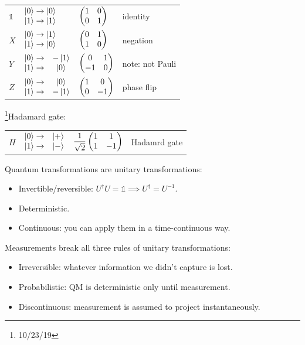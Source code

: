 \documentclass[12pt]{article}
\newcommand*\id{\mathds{1}}
\begin{document}
\begin{center}
\begin{tabular}{llll}
    $\id$
    & $\mqty{\ket{0}\rightarrow\ket{0} \\ \ket{1}\rightarrow\ket{1}}$
    & $\pmqty{\imat{2}}$
    & identity
    \\[5ex] $X$
    & $\mqty{\ket{0}\rightarrow\ket{1} \\ \ket{1}\rightarrow\ket{0}}$
    & $\pmqty{\pmat{1}}$
    & negation
    \\[5ex] $Y$
    & $\mqty{\ket{0}\rightarrow&-\ket{1} \\ \ket{1}\rightarrow&\ket{0}}$
    & $\pmqty{0&1\\-1&0}$
    & note: not Pauli
    \\[5ex] $Z$
    & $\mqty{\ket{0}\rightarrow&\ket{0} \\ \ket{1}\rightarrow&-\ket{1}}$
    & $\pmqty{\pmat{3}}$
    & phase flip
\end{tabular}
\end{center}

\footnote{10/23/19}Hadamard gate:
\begin{center}\begin{tabular}{llll}
    $H$
    & $\mqty{\ket{0}\rightarrow&\ket{+} \\ \ket{1}\rightarrow&\ket{-}}$
    & $\displaystyle\frac{1}{\sqrt{2}} \pmqty{1&1\\1&-1}$
    & Hadamrd gate
\end{tabular}\end{center}

Quantum transformations are unitary transformations:
\begin{itemize}
    \item Invertible/reversible: $U^\dag U = \id \implies U^\dag = U^{-1}$.
    \item Deterministic.
    \item Continuous: you can apply them in a time-continuous way.
\end{itemize}
Measurements break all three rules of unitary transformations:
\begin{itemize}
    \item Irreversible: whatever information we didn't capture is lost.
    \item Probabilistic: QM is deterministic only until measurement.
    \item Discontinuous: measurement is assumed to project instantaneously.
\end{itemize}
\end{document}
